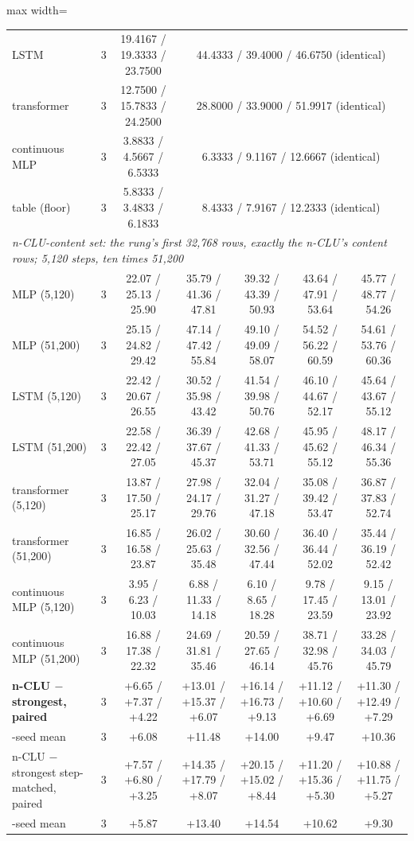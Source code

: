 \documentclass{article} %
\begin{document}
\begin{table}[t]
\begin{adjustbox}{max width=\linewidth}
\begin{tabular}{lcccccc}
LSTM & 3 & 19.4167 / 19.3333 / 23.7500 & \multicolumn{4}{c}{44.4333 / 39.4000 / 46.6750 (identical)} \\
transformer & 3 & 12.7500 / 15.7833 / 24.2500 & \multicolumn{4}{c}{28.8000 / 33.9000 / 51.9917 (identical)} \\
continuous MLP & 3 & 3.8833 / 4.5667 / 6.5333 & \multicolumn{4}{c}{6.3333 / 9.1167 / 12.6667 (identical)} \\
table (floor) & 3 & 5.8333 / 3.4833 / 6.1833 & \multicolumn{4}{c}{8.4333 / 7.9167 / 12.2333 (identical)} \\
\midrule
\multicolumn{7}{l}{\emph{n-CLU-content set: the rung's first 32,768 rows, exactly the n-CLU's content rows; 5,120 steps, ten times 51,200}} \\ %
MLP (5,120) & 3 & 22.07 / 25.13 / 25.90 & 35.79 / 41.36 / 47.81 & 39.32 / 43.39 / 50.93 & 43.64 / 47.91 / 53.64 & 45.77 / 48.77 / 54.26 \\
MLP (51,200) & 3 & 25.15 / 24.82 / 29.42 & 47.14 / 47.42 / 55.84 & 49.10 / 49.09 / 58.07 & 54.52 / 56.22 / 60.59 & 54.61 / 53.76 / 60.36 \\
LSTM (5,120) & 3 & 22.42 / 20.67 / 26.55 & 30.52 / 35.98 / 43.42 & 41.54 / 39.98 / 50.76 & 46.10 / 44.67 / 52.17 & 45.64 / 43.67 / 55.12 \\
LSTM (51,200) & 3 & 22.58 / 22.42 / 27.05 & 36.39 / 37.67 / 45.37 & 42.68 / 41.33 / 53.71 & 45.95 / 45.62 / 55.12 & 48.17 / 46.34 / 55.36 \\
transformer (5,120) & 3 & 13.87 / 17.50 / 25.17 & 27.98 / 24.17 / 29.76 & 32.04 / 31.27 / 47.18 & 35.08 / 39.42 / 53.47 & 36.87 / 37.83 / 52.74 \\
transformer (51,200) & 3 & 16.85 / 16.58 / 23.87 & 26.02 / 25.63 / 35.48 & 30.60 / 32.56 / 47.44 & 36.40 / 36.44 / 52.02 & 35.44 / 36.19 / 52.42 \\
continuous MLP (5,120) & 3 & 3.95 / 6.23 / 10.03 & 6.88 / 11.33 / 14.18 & 6.10 / 8.65 / 18.28 & 9.78 / 17.45 / 23.59 & 9.15 / 13.01 / 23.92 \\
continuous MLP (51,200) & 3 & 16.88 / 17.38 / 22.32 & 24.69 / 31.81 / 35.46 & 20.59 / 27.65 / 46.14 & 38.71 / 32.98 / 45.76 & 33.28 / 34.03 / 45.79 \\
\textbf{n-CLU $-$ strongest, paired} & 3 & +6.65 / +7.37 / +4.22 & +13.01 / +15.37 / +6.07 & +16.14 / +16.73 / +9.13 & +11.12 / +10.60 / +6.69 & +11.30 / +12.49 / +7.29 \\
\quad 3-seed mean & 3 & +6.08 & +11.48 & +14.00 & +9.47 & +10.36 \\
n-CLU $-$ strongest step-matched, paired & 3 & +7.57 / +6.80 / +3.25 & +14.35 / +17.79 / +8.07 & +20.15 / +15.02 / +8.44 & +11.20 / +15.36 / +5.30 & +10.88 / +11.75 / +5.27 \\
\quad 3-seed mean & 3 & +5.87 & +13.40 & +14.54 & +10.62 & +9.30 \\
\bottomrule
\end{tabular}\end{adjustbox}
\end{table}
\end{document}
